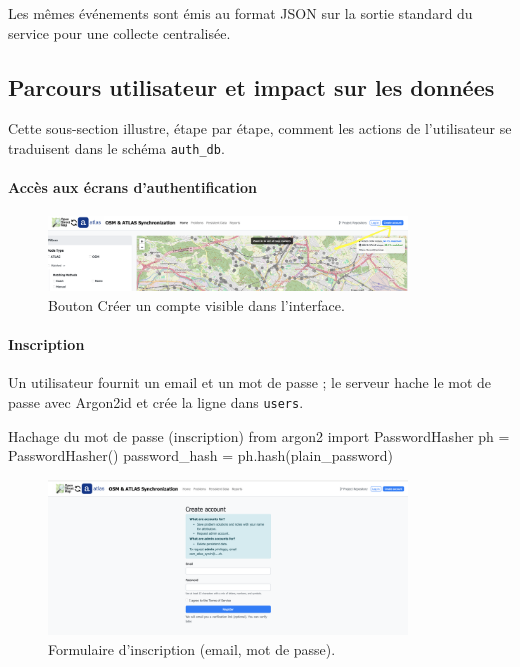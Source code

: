 \begin{itemize}
\noindent Les mêmes événements sont émis au format JSON sur la sortie standard du service pour une collecte centralisée.
\subsection{Parcours utilisateur et impact sur les données}
Cette sous-section illustre, étape par étape, comment les actions de l'utilisateur se traduisent dans le schéma \texttt{auth\_db}.

\paragraph{Accès aux écrans d'authentification}
\begin{figure}[H]
  \centering
  \includegraphics[width=0.85\textwidth]{../figures/chap10/auth1.png}
  \caption{Bouton \og Créer un compte \fg{} visible dans l'interface.}
\end{figure}

\paragraph{Inscription}
Un utilisateur fournit un email et un mot de passe ; le serveur hache le mot de passe avec Argon2id et crée la ligne dans \texttt{users}.

\begin{codebox}[language=Python]{Hachage du mot de passe (inscription)}
from argon2 import PasswordHasher
ph = PasswordHasher()
password_hash = ph.hash(plain_password)
\end{codebox}

\begin{figure}[H]
  \centering
  \includegraphics[width=0.85\textwidth]{../figures/chap10/create_account.png}
  \caption{Formulaire d'inscription (email, mot de passe).}
\end{figure}


\end{itemize}
